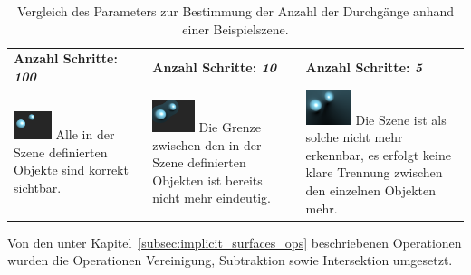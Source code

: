 \begin{table}[H]\label{table:sphere_tracing_steps}
    \centering
    \caption{Vergleich des Parameters zur Bestimmung der Anzahl der
        Durchgänge anhand einer Beispielszene.}
    \begin{tabular}{p{}p{}p{}}
        \toprule
            \textbf{Anzahl Schritte: \textit{100}} &
            \textbf{Anzahl Schritte: \textit{10}}  &
            \textbf{Anzahl Schritte: \textit{5}}   \\
        \cmidrule(r){1-1}\cmidrule(lr){2-2}\cmidrule(l){3-3}
            \includegraphics[width=0.3\textwidth]{img/sphere_tracing_steps_full.png} \newline
            Alle in der Szene definierten Objekte sind korrekt sichtbar. &
            \includegraphics[width=0.3\textwidth]{img/sphere_tracing_steps_less.png} \newline
            Die Grenze zwischen den in der Szene definierten Objekten
            ist bereits nicht mehr eindeutig. &
            \includegraphics[width=0.3\textwidth]{img/sphere_tracing_steps_min.png} \newline
            Die Szene ist als solche nicht mehr erkennbar, es erfolgt
            keine klare Trennung zwischen den einzelnen Objekten mehr.  \\
        \bottomrule
    \end{tabular}
\end{table}

Von den unter Kapitel~\ref{subsec:implicit_surfaces_ops} beschriebenen
Operationen wurden die Operationen Vereinigung, Subtraktion sowie Intersektion
umgesetzt.

